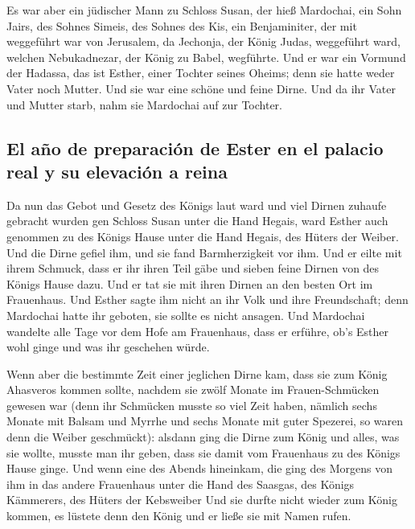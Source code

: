  Es war aber ein jüdischer Mann zu Schloss Susan, der hieß
Mardochai, ein Sohn Jairs, des Sohnes Simeis, des Sohnes des Kis, ein
Benjaminiter,  der mit weggeführt war von Jerusalem, da
Jechonja, der König Judas, weggeführt ward, welchen Nebukadnezar, der
König zu Babel, wegführte.  Und er war ein Vormund der
Hadassa, das ist Esther, einer Tochter seines Oheims; denn sie hatte
weder Vater noch Mutter. Und sie war eine schöne und feine Dirne. Und da
ihr Vater und Mutter starb, nahm sie Mardochai auf zur Tochter.

\hypertarget{el-auxf1o-de-preparaciuxf3n-de-ester-en-el-palacio-real-y-su-elevaciuxf3n-a-reina}{%
\subsection{El año de preparación de Ester en el palacio real y su
elevación a
reina}\label{el-auxf1o-de-preparaciuxf3n-de-ester-en-el-palacio-real-y-su-elevaciuxf3n-a-reina}}

 Da nun das Gebot und Gesetz des Königs laut ward und viel
Dirnen zuhaufe gebracht wurden gen Schloss Susan unter die Hand Hegais,
ward Esther auch genommen zu des Königs Hause unter die Hand Hegais, des
Hüters der Weiber.  Und die Dirne gefiel ihm, und sie fand
Barmherzigkeit vor ihm. Und er eilte mit ihrem Schmuck, dass er ihr
ihren Teil gäbe und sieben feine Dirnen von des Königs Hause dazu. Und
er tat sie mit ihren Dirnen an den besten Ort im Frauenhaus.
 Und Esther sagte ihm nicht an ihr Volk und ihre
Freundschaft; denn Mardochai hatte ihr geboten, sie sollte es nicht
ansagen.  Und Mardochai wandelte alle Tage vor dem Hofe
am Frauenhaus, dass er erführe, ob's Esther wohl ginge und was ihr
geschehen würde.

 Wenn aber die bestimmte Zeit einer jeglichen Dirne kam,
dass sie zum König Ahasveros kommen sollte, nachdem sie zwölf Monate im
Frauen-Schmücken gewesen war (denn ihr Schmücken musste so viel Zeit
haben, nämlich sechs Monate mit Balsam und Myrrhe und sechs Monate mit
guter Spezerei, so waren denn die Weiber geschmückt): 
alsdann ging die Dirne zum König und alles, was sie wollte, musste man
ihr geben, dass sie damit vom Frauenhaus zu des Königs Hause ginge.
 Und wenn eine des Abends hineinkam, die ging des Morgens
von ihm in das andere Frauenhaus unter die Hand des Saasgas, des Königs
Kämmerers, des Hüters der Kebsweiber Und sie durfte nicht wieder zum
König kommen, es lüstete denn den König und er ließe sie mit Namen
rufen.

